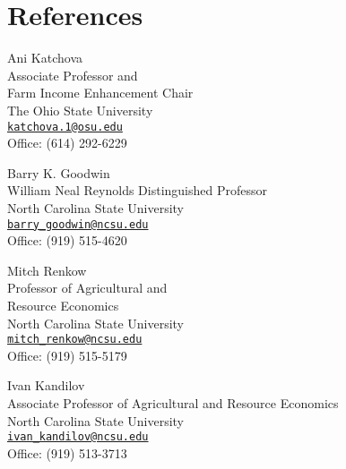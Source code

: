\documentclass[letterpaper]{article}
\renewenvironment{itemize}{
  \begin{list}{}{
    \setlength{\leftmargin}{1.5em}
  }
}{
  \end{list}
}
\begin{document}

\section*{References}

\begin{multicols}{2}
\begin{itemize}
\item Ani Katchova \\ Associate Professor and \\ Farm Income Enhancement Chair \\ The Ohio State University \\ \href{mailto:katchova.1@osu.edu}{\tt katchova.1@osu.edu} \\ Office: (614) 292-6229
\item Barry K. Goodwin \\ William Neal Reynolds Distinguished Professor \\ North Carolina State University \\ \href{mailto:barry\_goodwin@ncsu.edu}{\tt barry\_goodwin@ncsu.edu} \\ Office: (919) 515-4620

\item Mitch Renkow \\ Professor of Agricultural and \\ Resource Economics \\ North Carolina State University \\ \href{mailto:mitch\_renkow@ncsu.edu}{\tt mitch\_renkow@ncsu.edu} \\ Office: (919) 515-5179
\item Ivan Kandilov \\ Associate Professor of Agricultural and Resource Economics \\ North Carolina State University \\ \href{mailto:ivan\_kandilov@ncsu.edu}{\tt ivan\_kandilov@ncsu.edu} \\ Office: (919) 513-3713
\end{itemize}
\end{multicols}
\end{document}
